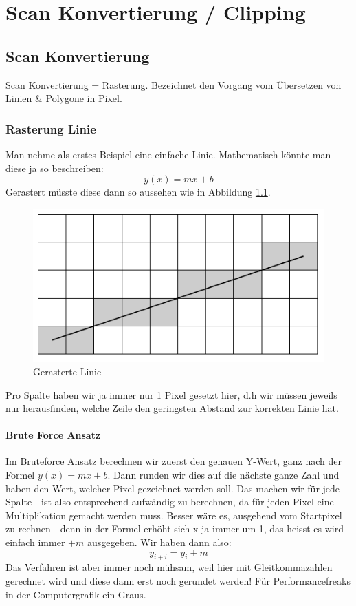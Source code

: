 \chapter{Scan Konvertierung / Clipping}
\section{Scan Konvertierung}
Scan Konvertierung = Rasterung. Bezeichnet den Vorgang vom Übersetzen von Linien \& Polygone in Pixel.
\subsection{Rasterung Linie}
Man nehme als erstes Beispiel eine einfache Linie. Mathematisch könnte man diese ja so beschreiben:
\begin{displaymath}
y(x)=mx+b
\end{displaymath}
Gerastert müsste diese dann so aussehen wie in Abbildung \ref{fig:gerasterte_linie}.
\begin{figure}[!ht]
	\centering
	\includegraphics[width=0.4\linewidth]{fig/gerasterte_linie}
	\caption{Gerasterte Linie}
	\label{fig:gerasterte_linie}
\end{figure}
Pro Spalte haben wir ja immer nur 1 Pixel gesetzt hier, d.h wir müssen jeweils nur herausfinden, welche Zeile den geringsten Abstand zur korrekten Linie hat.



\subsubsection{Brute Force Ansatz}
Im Bruteforce Ansatz berechnen wir zuerst den genauen Y-Wert, ganz nach der Formel \(y(x)=mx+b\). Dann runden wir dies auf die nächste ganze Zahl und haben den Wert, welcher Pixel gezeichnet werden soll. Das machen wir für jede Spalte - ist also entsprechend aufwändig zu berechnen, da für jeden Pixel eine Multiplikation gemacht werden muss. Besser wäre es, ausgehend vom Startpixel zu rechnen - denn in der Formel erhöht sich x ja immer um 1, das heisst es wird einfach immer \(+ m\) ausgegeben. Wir haben dann also:
\begin{displaymath}
y_{i+i}=y_i+m
\end{displaymath}
Das Verfahren ist aber immer noch mühsam, weil hier mit Gleitkommazahlen gerechnet wird und diese dann erst noch gerundet werden! Für Performancefreaks in der Computergrafik ein Graus.

